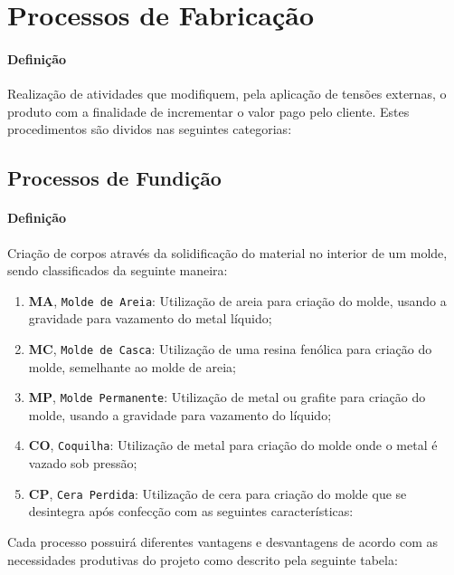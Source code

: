\documentclass{article}
\begin{document}
    \section{Processos de Fabricação}
        \paragraph{Definição}Realização de atividades que modifiquem, pela aplicação de tensões externas, o produto com a finalidade de incrementar o valor pago pelo cliente. Estes procedimentos são dividos nas seguintes categorias:

        \subsection{Processos de Fundição}
            \paragraph{Definição}Criação de corpos através da solidificação do material no interior de um molde, sendo classificados da seguinte maneira:
                \begin{enumerate}[rightmargin = \leftmargin]
                    \item \textbf{MA}, \texttt{Molde de Areia}: Utilização de areia para criação do molde, usando a gravidade para vazamento do metal líquido;

                    \item \textbf{MC}, \texttt{Molde de Casca}: Utilização de uma resina fenólica para criação do molde, semelhante ao molde de areia;

                    \item \textbf{MP}, \texttt{Molde Permanente}: Utilização de metal ou grafite para criação do molde, usando a gravidade para vazamento do líquido;

                    \item \textbf{CO}, \texttt{Coquilha}: Utilização de metal para criação do molde onde o metal é vazado sob pressão;

                    \item \textbf{CP}, \texttt{Cera Perdida}: Utilização de cera para criação do molde que se desintegra após confecção com as seguintes características:
                \end{enumerate}
            Cada processo possuirá diferentes vantagens e desvantagens de acordo com as necessidades produtivas do projeto como descrito pela seguinte tabela:
\end{document}
